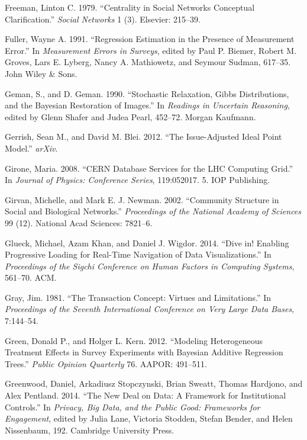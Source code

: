 \documentclass[]{krantz}
\begin{document}
\hypertarget{ref-freeman1979centrality}{}
Freeman, Linton C. 1979. ``Centrality in Social Networks Conceptual
Clarification.'' \emph{Social Networks} 1 (3). Elsevier: 215--39.

\hypertarget{ref-fuller1991regression}{}
Fuller, Wayne A. 1991. ``Regression Estimation in the Presence of
Measurement Error.'' In \emph{Measurement Errors in Surveys}, edited by
Paul P. Biemer, Robert M. Groves, Lars E. Lyberg, Nancy A. Mathiowetz,
and Seymour Sudman, 617--35. John Wiley \& Sons.

\hypertarget{ref-geman-90}{}
Geman, S., and D. Geman. 1990. ``Stochastic Relaxation, Gibbs
Distributions, and the Bayesian Restoration of Images.'' In
\emph{Readings in Uncertain Reasoning}, edited by Glenn Shafer and Judea
Pearl, 452--72. Morgan Kaufmann.

\hypertarget{ref-gerrish-12}{}
Gerrish, Sean M., and David M. Blei. 2012. ``The Issue-Adjusted Ideal
Point Model.'' \emph{arXiv}.

\hypertarget{ref-girone2008cern}{}
Girone, Maria. 2008. ``CERN Database Services for the LHC Computing
Grid.'' In \emph{Journal of Physics: Conference Series}, 119:052017. 5.
IOP Publishing.

\hypertarget{ref-girvan2002community}{}
Girvan, Michelle, and Mark E. J. Newman. 2002. ``Community Structure in
Social and Biological Networks.'' \emph{Proceedings of the National
Academy of Sciences} 99 (12). National Acad Sciences: 7821--6.

\hypertarget{ref-glueck2014dive}{}
Glueck, Michael, Azam Khan, and Daniel J. Wigdor. 2014. ``Dive in!
Enabling Progressive Loading for Real-Time Navigation of Data
Visualizations.'' In \emph{Proceedings of the Sigchi Conference on Human
Factors in Computing Systems}, 561--70. ACM.

\hypertarget{ref-gray1981transaction}{}
Gray, Jim. 1981. ``The Transaction Concept: Virtues and Limitations.''
In \emph{Proceedings of the Seventh International Conference on Very
Large Data Bases}, 7:144--54.

\hypertarget{ref-green2012modeling}{}
Green, Donald P., and Holger L. Kern. 2012. ``Modeling Heterogeneous
Treatment Effects in Survey Experiments with Bayesian Additive
Regression Trees.'' \emph{Public Opinion Quarterly} 76. AAPOR: 491--511.

\hypertarget{ref-greenwood2014}{}
Greenwood, Daniel, Arkadiusz Stopczynski, Brian Sweatt, Thomas Hardjono,
and Alex Pentland. 2014. ``The New Deal on Data: A Framework for
Institutional Controls.'' In \emph{Privacy, Big Data, and the Public
Good: Frameworks for Engagement}, edited by Julia Lane, Victoria
Stodden, Stefan Bender, and Helen Nissenbaum, 192. Cambridge University
Press.
\end{document}
